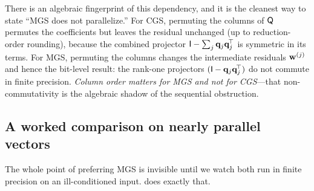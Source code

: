 There is an algebraic fingerprint of this dependency, and it is the cleanest way to
state ``MGS does not parallelize.'' For CGS, permuting the columns of $\mathsf{Q}$
permutes the coefficients but leaves the residual unchanged (up to reduction-order
rounding), because the combined projector $\mathsf{I} - \sum_j\mathbf{q}_j\mathbf{q}_j^{\!\top}$ is
symmetric in its terms. For MGS, permuting the columns changes the intermediate
residuals $\mathbf{w}^{(j)}$ and hence the bit-level result: the rank-one projectors
$(\mathsf{I} - \mathbf{q}_j\mathbf{q}_j^{\!\top})$ do not commute in finite precision. \emph{Column
order matters for MGS and not for CGS}---that non-commutativity is the algebraic
shadow of the sequential obstruction.

\subsection{A worked comparison on nearly parallel vectors}

The whole point of preferring MGS is invisible until we watch both run in finite
precision on an ill-conditioned input.  does exactly that.

